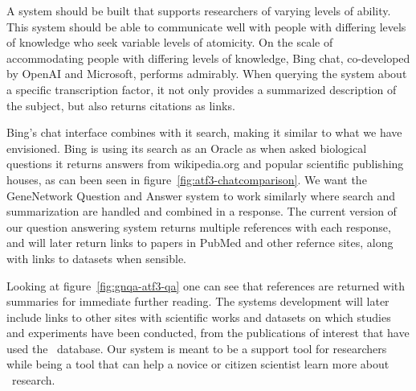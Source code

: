 A system should be built that supports researchers of varying levels of ability.
This system should be able to communicate well with people with differing levels of knowledge who seek variable levels of atomicity.
On the scale of accommodating people with differing levels of knowledge, Bing chat, co-developed by OpenAI and Microsoft, performs admirably.
When querying the system about a specific transcription factor, it not only provides a summarized description of the subject, but also returns citations as links.



Bing's chat interface combines with it search, making it similar to what we have envisioned. 
Bing is using its search as an Oracle as when asked biological questions it returns answers from wikipedia.org and popular scientific publishing houses, as can been seen in figure~\ref{fig:atf3-chatcomparison}.
We want the GeneNetwork Question and Answer system to work similarly where search and summarization are handled and combined in a response.
The current version of our question answering system returns multiple references with each response, and will later return links to papers in PubMed and other refernce sites, along with links to datasets when sensible.



Looking at figure~\ref{fig:gnqa-atf3-qa} one can see that references are returned with summaries for immediate further reading.
The systems development will later include links to other sites with scientific works and datasets on which studies and experiments have been conducted, from the publications of interest that have used the \GN\ database.
Our system is meant to be a support tool for researchers while being a tool that can help a novice or citizen scientist learn more about \GN\ research.